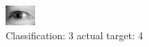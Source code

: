 \begin{figure}[h!]
\begin{center}
\includegraphics[width=0.60\columnwidth]{figures/ID3147_class_3_target_4.png}
\end{center}
\caption{ Classification: 3 actual target: 4}
\label{fig:ID3147_class_3_target_4}
\end{figure}
